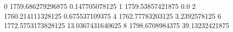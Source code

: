 0 1759.686279296875 0.147705078125
1 1759.53857421875 0.0
2 1760.214111328125 0.675537109375
4 1762.77783203125 3.2392578125
6 1772.5753173828125 13.0367431640625
8 1798.6708984375 39.13232421875
